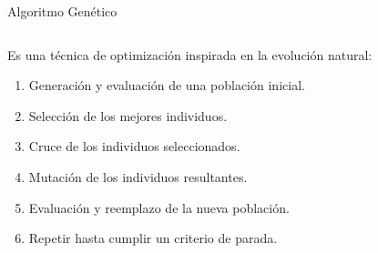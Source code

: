 \documentclass[handout]{beamer}
\begin{document}
\begin{frame}{Algoritmo Genético}
    \begin{columns}
        \begin{column}{0.7\textwidth}
            \begin{exampleblock}{Es una técnica de optimización inspirada en la evolución natural:}
                \begin{enumerate}[<+-| alert@+>]
                    \item Generación y evaluación de una población inicial.
                    \item Selección de los mejores individuos.
                    \item Cruce de los individuos seleccionados.
                    \item Mutación de los individuos resultantes.
                    \item Evaluación y reemplazo de la nueva población.
                    \item Repetir hasta cumplir un criterio de parada.
                \end{enumerate}
            \end{exampleblock}
        \end{column}
        \begin{column}{0.4\textwidth}
            \begin{figure}
                \centering

\end{figure}
\end{column}
\end{columns}
\end{frame}
\end{document}

